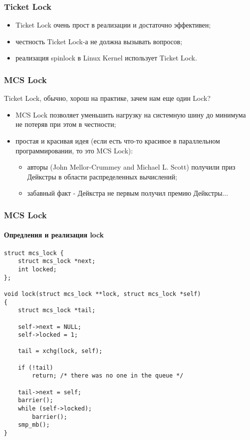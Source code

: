 \begin{frame}
\frametitle{Ticket Lock}

\begin{itemize}
  \item Ticket Lock очень прост в реализации и достаточно эффективен;
  \item честность Ticket Lock-а не должна вызывать вопросов;
  \item реализация spinlock в Linux Kernel использует Ticket Lock.
\end{itemize}
\end{frame}

\begin{frame}
\frametitle{MCS Lock}

Ticket Lock, обычно, хорош на практике, зачем нам еще один Lock?
\begin{itemize}
  \item<1-> MCS Lock позволяет уменьшить нагрузку на системную шину до минимума
        не потеряв при этом в честности;
  \item<2-> простая и красивая идея (если есть что-то красивое в параллельном
        программировании, то это MCS Lock):
        \begin{itemize}
          \item авторы (John Mellor-Crummey and Michael L. Scott) получили приз
                Дейкстры в области распределенных вычислений;
          \item забавный факт - Дейкстра не первым получил премию Дейкстры...
        \end{itemize}
\end{itemize}
\end{frame}

\begin{frame}[fragile]
\frametitle{MCS Lock}
\framesubtitle{Опредления и реализация lock}
\begin{lstlisting}
struct mcs_lock {
    struct mcs_lock *next;
    int locked;
};

void lock(struct mcs_lock **lock, struct mcs_lock *self)
{
    struct mcs_lock *tail;

    self->next = NULL;
    self->locked = 1;

    tail = xchg(lock, self);

    if (!tail)
        return; /* there was no one in the queue */

    tail->next = self;
    barrier();
    while (self->locked);
        barrier();
    smp_mb();
}
\end{lstlisting}
\end{frame}

